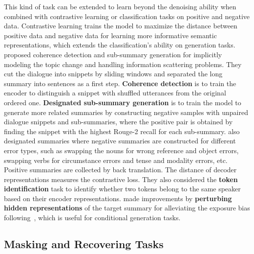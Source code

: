 This kind of task can be extended to learn beyond the denoising ability when 
combined with contrastive learning or classification tasks on positive and negative data. 
Contrastive learning trains the model to maximize 
the distance between positive data and negative data for learning more informative semantic representations, which extends the classification's ability on generation tasks.
\citet{liu2021topic} 
proposed {coherence detection} and {sub-summary generation} 
for implicitly modeling the topic change and handling information scattering 
problems. They cut the dialogue into snippets by sliding windows and 
separated the long summary into sentences as a first step.
\textbf{Coherence detection} is to train the encoder to distinguish 
a snippet with shuffled utterances from the original ordered one.
\textbf{Designated sub-summary generation} is to train the model to generate more related 
summaries by constructing negative samples with unpaired dialogue 
snippets and sub-summaries, where the positive pair is obtained 
by finding the snippet with the highest Rouge-2 recall for each sub-summary.
\citet{tang2021confit} also designated summaries where negative summaries are constructed for different error types, such as swapping the nouns for wrong reference and object errors, swapping verbs for circumstance errors and tense and modality errors, etc. Positive summaries are collected by back translation. The distance of decoder representations measures the contrastive loss.
They also considered the \textbf{token identification} task to identify whether two tokens belong to the same speaker based on their encoder representations.
\citet{zhao2021give} made improvements by \textbf{perturbing hidden representations} of 
the target summary for alleviating the exposure bias following~\citet{lee2020contrastive}, which is useful for conditional generation tasks.

\subsection{Masking and Recovering Tasks} 

